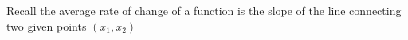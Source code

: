 \documentclass[preview]{standalone}
\begin{document}
\begin{center}
Recall the average rate of change of a function 
is the slope of the line connecting two given points 
$(x_1, x_2)$
\end{center}
\end{document}
